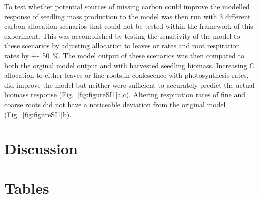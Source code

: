 \documentclass[a4paper]{article}\usepackage[]{graphicx}\usepackage[]{color}
\begin{document}
To test whether potential sources of missing carbon could improve the modelled response of seedling mass production to the model was then run with 3 different carbon allocation scenarios that could not be tested within the framework of this experiment. This was accomplished by testing the sensitivity of the model to these scenarios by adjusting allocation to leaves or rates and root respiration rates by +-~50~\%. The model output of these scenarios was then compared to both the orginal model output and with harvested seedling biomass.  Increasing C allocation to either leaves or fine roots,in coalescence with photosynthesis rates, did improve the model but neither were sufficient to accurately predict the actual biomass response  (Fig.~\ref{fig:figureSI1}a,c). Altering respiration rates of fine and coarse roots did not have a noticeable deviation from the original model (Fig.~\ref{fig:figureSI1}b).

\section*{Discussion}


\section{Tables}
\end{document}
